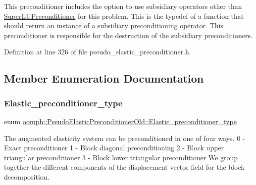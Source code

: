 This preconditioner includes the option to use subsidiary operators other than \hyperlink{classoomph_1_1SuperLUPreconditioner}{Super\+L\+U\+Preconditioner} for this problem. This is the typedef of a function that should return an instance of a subsidiary preconditioning operator. This preconditioner is responsible for the destruction of the subsidiary preconditioners. 



Definition at line 326 of file pseudo\+\_\+elastic\+\_\+preconditioner.\+h.



\subsection{Member Enumeration Documentation}
\mbox{\label{classoomph_1_1PseudoElasticPreconditionerOld_a6748360e3e2fbd4766d837a520dadfd0}} 
\subsubsection{\texorpdfstring{Elastic\+\_\+preconditioner\+\_\+type}{Elastic\_preconditioner\_type}}
{\footnotesize\ttfamily enum \hyperlink{classoomph_1_1PseudoElasticPreconditionerOld_a6748360e3e2fbd4766d837a520dadfd0}{oomph\+::\+Pseudo\+Elastic\+Preconditioner\+Old\+::\+Elastic\+\_\+preconditioner\+\_\+type}}



The augmented elasticity system can be preconditioned in one of four ways. 0 -\/ Exact preconditioner 1 -\/ Block diagonal preconditioning 2 -\/ Block upper triangular preconditioner 3 -\/ Block lower triangular preconditioner We group together the different components of the displacement vector field for the block decomposition. 

